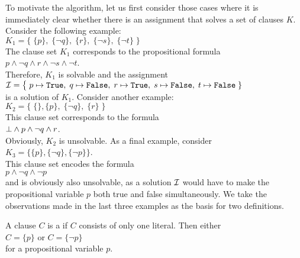To motivate the algorithm, let us first consider those cases where
it is immediately clear whether there is an assignment that solves a set of clauses $K$.
Consider the following example: \\[0.2cm]
\hspace*{1.3cm} 
$K_1 = \bigl\{\; \{p\},\; \{\neg q\},\; \{r\},\; \{\neg s\}, \; \{\neg t\} \;\bigr\}$ 
\\[0.2cm]
The clause set $K_1$ corresponds to the propositional formula
\\[0.2cm]
\hspace*{1.3cm}
$p \wedge \neg q \wedge r \wedge \neg s \wedge \neg t$.
\\[0.2cm]
Therefore, $K_1$ is solvable and the assignment  \\[0.2cm]
\hspace*{1.3cm} 
$\mathcal{I} = \bigl\{\; p \mapsto \texttt{True},\; q \mapsto \texttt{False},\; r \mapsto \texttt{True},\; s \mapsto
\texttt{False},\; t \mapsto \texttt{False}\;\}$
\\[0.2cm]
is a solution of $K_1$. Consider another example: \\[0.2cm]
\hspace*{1.3cm} 
$K_2 = \bigl\{\; \{\}, \{p\},\; \{\neg q\},\; \{r\}\; \bigr\}$ 
\\[0.2cm]
This clause set corresponds to the formula
\\[0.2cm]
\hspace*{1.3cm}
$\bot \wedge p \wedge \neg q \wedge r$.
\\[0.2cm]
Obviously, $K_2$ is unsolvable. As a final example, consider
\\[0.2cm]
\hspace*{1.3cm} $K_3 = \bigl\{ \{p\}, \{\neg q\}, \{\neg p\} \bigr\}$.
\\[0.2cm]
This clause set encodes the formula
\\[0.2cm]
\hspace*{1.3cm}
$p \wedge \neg q \wedge \neg p $
\\[0.2cm]
and is obviously also unsolvable, as a solution $\mathcal{I}$ would have to make the propositional variable $p$ both
true and false simultaneously. We take the observations made in the last three examples as the basis for two
definitions.

\begin{Definition}
  A clause $C$ is a  if $C$ consists of only one literal.
  Then either
  \\[0.2cm]
  \hspace*{1.3cm}
  $C = \{p\}$ \quad or \quad $C = \{\neg p\}$ 
  \\[0.2cm]
  for a propositional variable $p$. \eox
\end{Definition}

